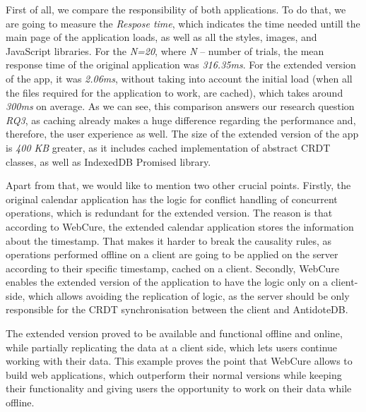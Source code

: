 First of all, we compare the responsibility of both applications. To do that, we are going to measure the \textit{Respose time}, which indicates the time needed untill the main page of the application loads, as well as all the styles, images, and JavaScript libraries. For the \textit{N=20}, where \textit{N} -- number of trials, the mean response time of the original application was \textit{316.35ms}. For the extended version of the app, it was \textit{2.06ms}, without taking into account the initial load (when all the files required for the application to work, are cached), which takes around \textit{300ms} on average. As we can see, this comparison answers our research question \textit{RQ3}, as caching already makes a huge difference regarding the performance and, therefore, the user experience as well. The size of the extended version of the app is \textit{400 KB} greater, as it includes cached implementation of abstract CRDT classes, as well as IndexedDB Promised library.

Apart from that, we would like to mention two other crucial points. Firstly, the original calendar application has the logic for conflict handling of concurrent operations, which is redundant for the extended version. The reason is that according to WebCure, the extended calendar application stores the information about the timestamp. That makes it harder to break the causality rules, as operations performed offline on a client are going to be applied on the server according to their specific timestamp, cached on a client. Secondly, WebCure enables the extended version of the application to have the logic only on a client-side, which allows avoiding the replication of logic, as the server should be only responsible for the CRDT synchronisation between the client and AntidoteDB.

The extended version proved to be available and functional offline and online, while partially replicating the data at a client side, which lets users continue working with their data. This example proves the point that WebCure allows to build web applications, which outperform their normal versions while keeping their functionality and giving users the opportunity to work on their data while offline.